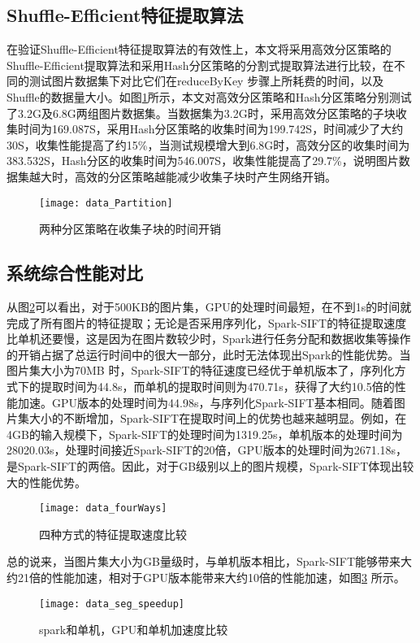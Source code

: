 \subsection{Shuffle-Efficient特征提取算法}
在验证Shuffle-Efficient特征提取算法的有效性上，本文将采用高效分区策略的Shuffle-Efficient提取算法和采用Hash分区策略的分割式提取算法进行比较，在不同的测试图片数据集下对比它们在reduceByKey 步骤上所耗费的时间，以及Shuffle的数据量大小。如图\ref{fig:data_Partition}所示，本文对高效分区策略和Hash分区策略分别测试了3.2G及6.8G两组图片数据集。当数据集为3.2G时，采用高效分区策略的子块收集时间为169.087S，采用Hash分区策略的收集时间为199.742S，时间减少了大约30S，收集性能提高了约15\%，当测试规模增大到6.8G时，高效分区的收集时间为383.532S，Hash分区的收集时间为546.007S，收集性能提高了29.7\%，说明图片数据集越大时，高效的分区策略越能减少收集子块时产生网络开销。
\begin{figure}[htp]
\centering
\texttt{[image: data\_Partition]}
\caption{两种分区策略在收集子块的时间开销}
\label{fig:data_Partition}
\end{figure}

\subsection{系统综合性能对比}
从图\ref{fig:data_fourWays}可以看出，对于500KB的图片集，GPU的处理时间最短，在不到1s的时间就完成了所有图片的特征提取；无论是否采用序列化，Spark-SIFT的特征提取速度比单机还要慢，这是因为在图片数较少时，Spark进行任务分配和数据收集等操作的开销占据了总运行时间中的很大一部分，此时无法体现出Spark的性能优势。当图片集大小为70MB 时，Spark-SIFT的特征速度已经优于单机版本了，序列化方式下的提取时间为44.8s，而单机的提取时间则为470.71s，获得了大约10.5倍的性能加速。GPU版本的处理时间为44.98s，与序列化Spark-SIFT基本相同。随着图片集大小的不断增加，Spark-SIFT在提取时间上的优势也越来越明显。例如，在4GB的输入规模下，Spark-SIFT的处理时间为1319.25s，单机版本的处理时间为28020.03s，处理时间接近Spark-SIFT的20倍，GPU版本的处理时间为2671.18s，是Spark-SIFT的两倍。因此，对于GB级别以上的图片规模，Spark-SIFT体现出较大的性能优势。
\begin{figure}[htp]
\centering
\texttt{[image: data\_fourWays]}
\caption{四种方式的特征提取速度比较}
\label{fig:data_fourWays}
\end{figure}

总的说来，当图片集大小为GB量级时，与单机版本相比，Spark-SIFT能够带来大约21倍的性能加速，相对于GPU版本能带来大约10倍的性能加速，如图\ref{fig:data_seg_speedup} 所示。
\begin{figure}[htp]
\centering
\texttt{[image: data\_seg\_speedup]}
\caption{spark和单机，GPU和单机加速度比较}
\label{fig:data_seg_speedup}
\end{figure}

